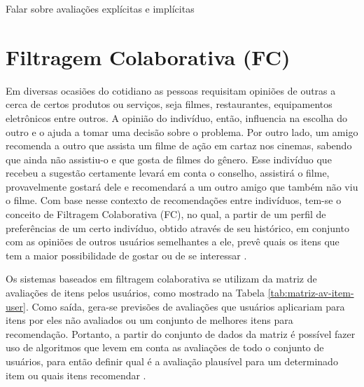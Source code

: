 Falar sobre avaliações explícitas e implícitas


\section{Filtragem Colaborativa (FC)}
    
    Em diversas ocasiões do cotidiano as pessoas requisitam opiniões de outras a cerca de certos produtos ou serviços, seja filmes, restaurantes, equipamentos eletrônicos entre outros. A opinião do indivíduo, então, influencia na escolha do outro e o ajuda a tomar uma decisão sobre o problema. Por outro lado, um amigo recomenda a outro que assista um filme de ação em cartaz nos cinemas, sabendo que ainda não assistiu-o e que gosta de filmes do gênero. Esse indivíduo que recebeu a sugestão certamente levará em conta o conselho, assistirá o filme, provavelmente gostará dele e recomendará a um outro amigo que também não viu o filme.    
    Com base nesse contexto de recomendações entre indivíduos, tem-se o conceito de Filtragem Colaborativa (FC), no qual, a partir de um perfil de preferências de um certo indivíduo, obtido através de seu histórico, em conjunto com as opiniões de outros usuários semelhantes a ele, prevê quais os itens que tem a maior possibilidade de gostar ou de se interessar \cite{Jannach2010}.



    
    Os sistemas baseados em filtragem colaborativa se utilizam da matriz de avaliações de itens pelos usuários, como mostrado na Tabela \ref{tab:matriz-av-item-user}. Como saída, gera-se previsões de avaliações que usuários aplicariam para itens por eles não avaliados ou um conjunto de melhores itens para recomendação. Portanto, a partir do conjunto de dados da matriz é possível fazer uso de algoritmos que levem em conta as avaliações de todo o conjunto de usuários, para então definir qual é a avaliação plausível para um determinado item ou quais itens recomendar \cite{Bobadilla_2013}.
    
